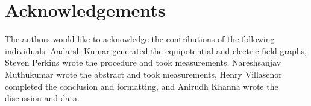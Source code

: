 ﻿\documentclass[10pt,journal,twoside]{IEEEtran}
\begin{document}
        
        
        
        
\section{Acknowledgements}
The authors would like to acknowledge the contributions of the following individuals: Aadarsh Kumar generated the equipotential and electric field graphs, Steven Perkins wrote the procedure and took measurements, Nareshsanjay Muthukumar wrote the abstract and took measurements, Henry Villasenor completed the conclusion and formatting, and Anirudh Khanna wrote the discussion and data.






\end{document}
